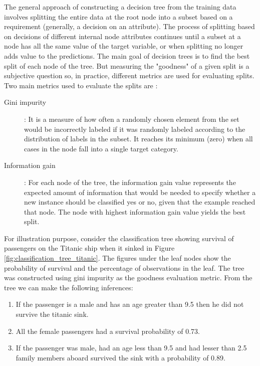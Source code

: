 \documentclass[11pt,openright]{report}
\begin{document}
The general approach of constructing a decision tree from the training data involves splitting the entire data at the root node into a subset based on a requirement (generally, a decision on an attribute). The process of splitting based on decisions of different internal node attributes continues until a subset at a node has all the same value of the target variable, or when splitting no longer adds value to the predictions. The main goal of decision trees is to find the best split of each node of the tree. But measuring the "goodness" of a given split is a subjective question so, in practice, different metrics are used for evaluating splits. Two main metrics used to evaluate the splits are :
\begin{description}
    \item[Gini impurity] : It is a measure of how often a randomly chosen element from the set would be incorrectly labeled if it was randomly labeled according to the distribution of labels in the subset. It reaches its minimum (zero) when all cases in the node fall into a single target category. 

    \item[Information gain] : For each node of the tree, the information gain value represents the expected amount of information that would be needed to specify whether a new instance should be classified yes or no, given that the example reached that node. The node with highest information gain value yields the best split. 
     
 \end{description}
 
For illustration purpose, consider the classification tree showing survival of passengers on the Titanic ship when it sinked in Figure \ref{fig:classification_tree_titanic}. The figures under the leaf nodes show the probability of survival and the percentage of observations in the leaf. The tree was constructed using gini impurity as the goodness evaluation metric. From the tree we can make the following inferences: 
\begin{enumerate}
  \item If the passenger is a male and has an age greater than 9.5 then he did not survive the titanic sink.
  \item All the female passengers had a survival probability of 0.73.
  \item If the passenger was male, had an age less than 9.5 and had lesser than 2.5 family members aboard survived the sink with a probability of 0.89.
\end{enumerate}
\end{document}
